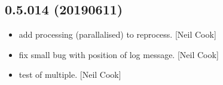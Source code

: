 \documentclass[a4paper,10pt,english]{report}
\begin{document}
\subsection{0.5.014 (2019\sphinxhyphen{}06\sphinxhyphen{}11)}
\label{\detokenize{misc/changelog:id141}}\begin{itemize}
\item {} 
 \sphinxhyphen{} add processing (parallalised) to reprocess. {[}Neil
Cook{]}

\item {} 
 \sphinxhyphen{} fix small bug with position of log message. {[}Neil
Cook{]}

\item {} 
 \sphinxhyphen{} test of multiple. {[}Neil Cook{]}

\end{itemize}
\end{document}
